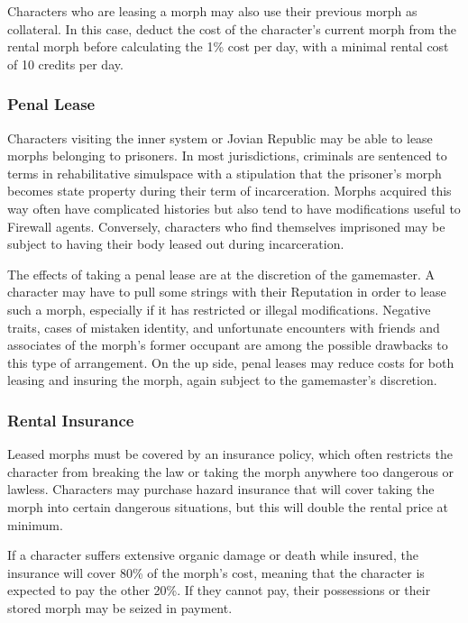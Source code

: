 Characters who are leasing a morph may also use their previous morph as collateral. In this case, deduct the cost of the character's current morph from the rental morph before calculating the 1\% cost per day, with a minimal rental cost of 10 credits per day. 

\subsubsection{Penal Lease} 

Characters visiting the inner system or Jovian Republic may be able to lease morphs belonging to prisoners. In most jurisdictions, criminals are sentenced to terms in rehabilitative simulspace with a stipulation that the prisoner's morph becomes state property during their term of incarceration. Morphs acquired this way often have complicated histories but also tend to have modifications useful to Firewall agents. Conversely, characters who find themselves imprisoned may be subject to having their body leased out during incarceration. 

The effects of taking a penal lease are at the discretion of the gamemaster. A character may have to pull some strings with their Reputation in order to lease such a morph, especially if it has restricted or illegal modifications. Negative traits, cases of mistaken identity, and unfortunate encounters with friends and associates of the morph's former occupant are among the possible drawbacks to this type of arrangement. On the up side, penal leases may reduce costs for both leasing and insuring the morph, again subject to the gamemaster's discretion. 

\subsubsection{Rental Insurance} 

Leased morphs must be covered by an insurance policy, which often restricts the character from breaking the law or taking the morph anywhere too dangerous or lawless. Characters may purchase hazard insurance that will cover taking the morph into certain dangerous situations, but this will double the rental price at minimum. 



If a character suffers extensive organic damage or death while insured, the insurance will cover 80\% of the morph's cost, meaning that the character is expected to pay the other 20\%. If they cannot pay, their possessions or their stored morph may be seized in payment. 

